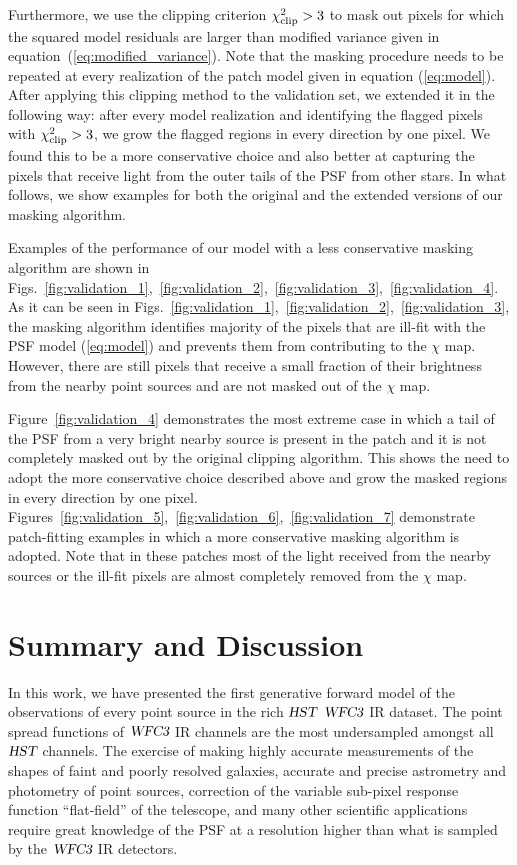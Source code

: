 Furthermore, we use the clipping criterion $\chi^{2}_{\rm clip}>3$ to mask out pixels for which the squared model residuals are larger than modified variance given in equation~(\ref{eq:modified_variance}).
Note that the masking procedure needs to be repeated at every realization of the patch model given in equation (\ref{eq:model}). After applying this clipping method to the validation set, we extended it in the following way: after every model realization and identifying the flagged pixels with $\chi^{2}_{\rm clip}>3$, we grow the flagged regions 
in every direction by one pixel. We found this to be a more conservative choice and also better at capturing the pixels that receive light from the outer tails of the PSF from other stars. In what follows, we show examples for both the original and the extended versions of our masking algorithm.

Examples of the performance of our model with a less conservative masking algorithm are shown in Figs.~\ref{fig:validation_1},~\ref{fig:validation_2},~\ref{fig:validation_3},~\ref{fig:validation_4}. As it can be seen in Figs.~\ref{fig:validation_1},~\ref{fig:validation_2},~\ref{fig:validation_3}, the masking algorithm identifies majority of the pixels that are ill-fit with the PSF model (\ref{eq:model}) and prevents them from contributing to the $\chi$ map. However, there are still pixels that receive a small fraction of their brightness from the nearby point sources and are not masked out of the $\chi$ map. 

Figure~\ref{fig:validation_4} demonstrates the most extreme case in which a tail of the PSF from a very bright nearby source is present in the patch and it is not completely masked out by the original clipping algorithm. This shows the need to adopt the more 
conservative choice described above and grow the masked regions in every direction by one pixel.
Figures~\ref{fig:validation_5},~\ref{fig:validation_6},~\ref{fig:validation_7} demonstrate patch-fitting examples in which a more conservative masking algorithm is adopted. Note that in these patches most of the light received from the nearby sources or the ill-fit pixels are almost completely removed from the $\chi$ map.

\section{Summary and Discussion}\label{sec:hstsummary}

In this work, we have presented the first generative forward model of the observations of every point source in the rich ${\textsl{HST}}$ ${\textsl{WFC3}}$ IR dataset. 
The point spread functions of ${\textsl{WFC3}}$ IR channels are the most undersampled amongst all ${\textsl{HST}}$ channels. 
The exercise of making highly accurate measurements of the shapes of faint and poorly resolved galaxies, accurate and precise astrometry and photometry of point sources, 
correction of the variable sub-pixel response function ``flat-field'' of the telescope, and many other scientific applications require great knowledge of 
the PSF at a resolution higher than what is sampled by the ${\textsl{WFC3}}$ IR detectors. 

